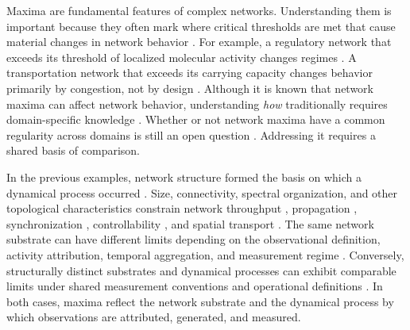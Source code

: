 \documentclass{article}
\begin{document}
\begingroup
\renewcommand{\abstractname}{Significance}
\begin{abstract}
\noindent
    Scientific disciplines traditionally examine networked systems in isolation. Pollination networks, communication platforms, and wind farms all have different governing dynamics and are measured in different units. Consequently, observations in one field are rarely useful in another. Here, we demonstrate that when network structure and dynamical processes are mapped into a unit-free coordinate space, peak intensities across a wide range of disciplines fall beneath a shared upper bound. This learned regularity allows researchers and practitioners to use cross-disciplinary evidence to estimate network capacity.
\end{abstract}
\endgroup
\clearpage

\vspace{1em}
\label{sec:intro}
Maxima are fundamental features of complex networks. Understanding them is important because they often mark where critical thresholds are met that cause material changes in network behavior \citep{ref01, ref02, ref16, ref33, ref34}. For example, a regulatory network that exceeds its threshold of localized molecular activity changes regimes \citep{ref25,ref02}. A transportation network that exceeds its carrying capacity changes behavior primarily by congestion, not by design \citep{ref03,ref04}. Although it is known that network maxima can affect network behavior, understanding \textit{how} traditionally requires domain-specific knowledge \citep{ref02,ref03}. Whether or not network maxima have a common regularity across domains is still an open question \citep{ref13,ref14,ref15}. Addressing it requires a shared basis of comparison.

In the previous examples, network structure formed the basis on which a dynamical process occurred \citep{ref02, ref03, ref04, ref05, ref15, ref33}. Size, connectivity, spectral organization, and other topological characteristics constrain network throughput \citep{ref07,ref08,ref28,ref35}, propagation \citep{ref09,ref10,ref30}, synchronization \citep{ref11}, controllability \citep{ref27}, and spatial transport \citep{ref32}. The same network substrate can have different limits depending on the observational definition, activity attribution, temporal aggregation, and measurement regime \citep{ref06,ref26,ref12}. Conversely, structurally distinct substrates and dynamical processes can exhibit comparable limits under shared measurement conventions and operational definitions \citep{ref17,ref18,ref24,ref15}. In both cases, maxima reflect the network substrate and the dynamical process by which observations are attributed, generated, and measured.
\end{document}
